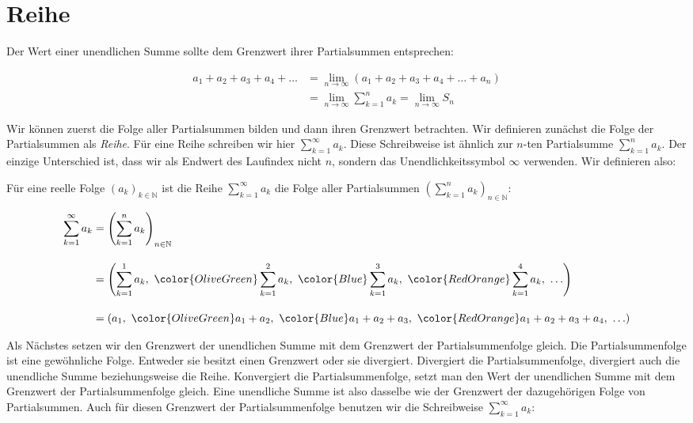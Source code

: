 \documentclass[fontsize=9pt,
               parskip=half-,
               DIV=14,
               listof=chapterentry,
               tocflat]{scrbook}
\begin{document}
\section{Reihe}

Der Wert einer unendlichen Summe sollte dem Grenzwert ihrer Partialsummen entsprechen:

\begin{align*}
a_{1}+a_{2}+a_{3}+a_{4}+\ldots &=\lim _{n\to \infty }(a_{1}+a_{2}+a_{3}+a_{4}+\ldots +a_{n})\\&=\lim _{n\to \infty }\sum _{k=1}^{n}a_{k}=\lim _{n\to \infty }S_{n}
\end{align*}

Wir können zuerst die Folge aller Partialsummen bilden und dann ihren Grenzwert betrachten. Wir definieren zunächst die Folge der Partialsummen als \emph{Reihe}. Für eine Reihe schreiben wir hier $\sum _{k=1}^{\infty }a_{k}$. Diese Schreibweise ist ähnlich zur $n$-ten Partialsumme $\sum _{k=1}^{n}a_{k}$. Der einzige Unterschied ist, dass wir als Endwert des Laufindex nicht $n$, sondern das Unendlichkeitssymbol $\infty $ verwenden. Wir definieren also:

\begin{definition*}[Reihe]
Für eine reelle Folge $(a_{k})_{k\in \mathbb {N} }$ ist die Reihe $\sum _{k=1}^{\infty }a_{k}$ die Folge aller Partialsummen $\left(\sum _{k=1}^{n}a_{k}\right)_{n\in \mathbb {N} }$:

\begin{align*}
\sum _{k=1}^{\infty }a_{k}&=\left(\sum _{k=1}^{n}a_{k}\right)_{n\in \mathbb {N} }\\[1em]&=\left(\sum _{k=1}^{1}a_{k},\ {\color {OliveGreen}\sum _{k=1}^{2}a_{k}},\ {\color {Blue}\sum _{k=1}^{3}a_{k}},\ {\color {RedOrange}\sum _{k=1}^{4}a_{k}},\ \ldots \right)\\[1em]&=\left(a_{1},\ {\color {OliveGreen}a_{1}+a_{2}},\ {\color {Blue}a_{1}+a_{2}+a_{3}},\ {\color {RedOrange}a_{1}+a_{2}+a_{3}+a_{4}},\ \ldots \right)
\end{align*}

\end{definition*}

Als Nächstes setzen wir den Grenzwert der unendlichen Summe mit dem Grenzwert der Partialsummenfolge gleich. Die Partialsummenfolge ist eine gewöhnliche Folge. Entweder sie besitzt einen Grenzwert oder sie divergiert. Divergiert die Partialsummenfolge, divergiert auch die unendliche Summe beziehungsweise die Reihe. Konvergiert die Partialsummenfolge, setzt man den Wert der unendlichen Summe mit dem Grenzwert der Partialsummenfolge gleich. Eine unendliche Summe ist also dasselbe wie der Grenzwert der dazugehörigen Folge von Partialsummen. Auch für diesen Grenzwert der Partialsummenfolge benutzen wir die Schreibweise $\sum _{k=1}^{\infty }a_{k}$:
\end{document}

